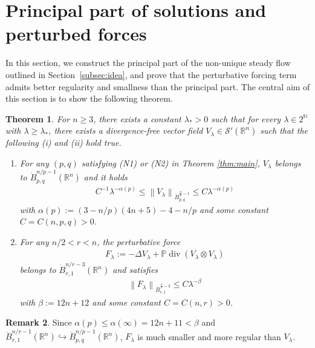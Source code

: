 \documentclass[a4paper,12pt,reqno]{amsart}
\theoremstyle{plain}
\newtheorem{thm}{Theorem}[section]
\theoremstyle{definition}
\newtheorem{rem}[thm]{Remark}
\renewcommand{\div}{\operatorname{div}}
\newcommand{\dB}{\dot{B}}
\renewcommand{\leq}{\leqslant}
\renewcommand{\geq}{\geqslant}
\newcommand{\n}[1]{{\left\|#1\right\|}}
\newcommand{\R}{\mathbb{R}}
\newcommand{\N}{\mathbb{N}}
\begin{document}
\section{Principal part of solutions and perturbed forces}\label{sec:V}
In this section, we construct the principal part of the non-unique steady flow outlined in Section~\ref{subsec:idea}, and prove that the perturbative forcing term admits better regularity and smallness than the principal part. 
The central aim of this section is to show the following theorem.
\begin{thm}\label{thm:p-sol}
    For $n \geq 3$, 
    there exists a constant $\lambda_*>0$ such that for every $\lambda \in 2^{\N}$ with $\lambda \geq \lambda_*$, 
    there exists a divergence-free vector field $V_\lambda \in \mathscr{S}'(\R^n)$
    such that the following {\rm (i)} and {\rm (ii)} hold true.
    \begin{enumerate}
        \item [\rm (i)]
        For any $(p,q)$ satisfying {\rm (N1)} or {\rm (N2)} in Theorem \ref{thm:main},
        $V_\lambda$ belongs to $\dB_{p,q}^{n/p-1}(\R^n)$ and it holds 
        \begin{align}\label{est:V-optimal}
            C^{-1}\lambda^{-\alpha(p)}
            \leq 
            \n{V_{\lambda}}_{\dB_{p,q}^{\frac{n}{p}-1}} 
            \leq 
            C\lambda^{-\alpha(p)}
        \end{align}
        with $\alpha(p):=(3-n/p)(4n+5)-4-n/p$ and some constant $C=C(n,p,q)>0$.
        \item [\rm (ii)] 
        For any $n/2< r<n$,
        the perturbative force 
        \begin{align}
            F_{\lambda}:=-\Delta V_{\lambda} + \mathbb{P}\div (V_{\lambda} \otimes V_{\lambda})
        \end{align}
        belongs to $\dB_{r,1}^{n/r-3}(\R^n)$ and satisfies
        \begin{align}\label{est:F}
            \n{F_{\lambda}}_{\dB_{r,1}^{\frac{n}{r}-3}}
            \leq C\lambda^{-\beta}
        \end{align}
        with $\beta:=12n+12$ and some constant $C=C(n,r)>0$.
    \end{enumerate}
\end{thm}
\begin{rem}
    Since $\alpha(p) \leq \alpha(\infty) = 12 n+11 < \beta$ and $\dB_{r,1}^{n/r-1}(\R^n) \hookrightarrow \dB_{p,q}^{n/p-1}(\R^n)$, 
    $F_{\lambda}$ is much smaller and more regular than $V_{\lambda}$.
\end{rem}
\end{document}
